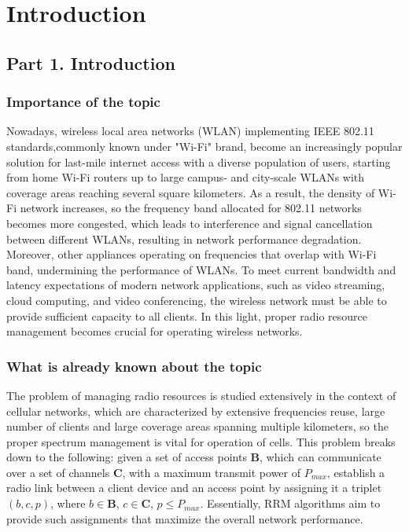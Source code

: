 \chapter{Introduction}
\label{chap:intro}

\section{Part 1. Introduction}
\subsection{Importance of the topic}
Nowadays, wireless local area networks (WLAN) implementing IEEE 802.11 standards,commonly known under "Wi-Fi" brand, become an increasingly popular solution for last-mile internet access with a diverse population of users, starting from home Wi-Fi routers up to large campus- and city-scale WLANs with coverage areas reaching several square kilometers.
As a result, the density of Wi-Fi network increases, so the frequency band allocated for 802.11 networks becomes more congested, which leads to interference and signal cancellation between different WLANs, resulting in network performance degradation.
Moreover, other appliances operating on frequencies that overlap with Wi-Fi band, undermining the performance of WLANs.
To meet current bandwidth and latency expectations of modern network applications, such as video streaming, cloud computing, and video conferencing, the wireless network must be able to provide sufficient capacity to all clients. In this light, proper radio resource management becomes crucial for operating wireless networks.
\subsection{What is already known about the topic}
The problem of managing radio resources is studied extensively in the context of cellular networks, which are characterized by extensive frequencies reuse, large number of clients and large coverage areas spanning multiple kilometers, so the proper spectrum management is vital for operation of cells. This problem breaks down to the following: given a set of access points $\boldsymbol{B}$, which can communicate over a set of channels $\boldsymbol{C}$, with a maximum transmit power of $P_{max}$, establish a radio link between a client device and an access point by assigning it a triplet $(b, c, p)$, where $b \in \boldsymbol{B}$, $c \in \boldsymbol{C}$, $p \leq P_{max}$.
Essentially, RRM algorithms aim to provide such assignments that maximize the overall network performance.
